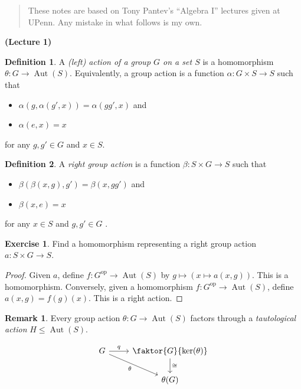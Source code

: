 \documentclass[10pt,letterpaper,cm]{nupset}
\theoremstyle{definition}
\newtheorem*{definition}{Definition}
\newtheorem{remark}{Remark}
\newtheorem{exercise}{Exercise}
\newcommand{\1}{\mathbf{1}}
\newcommand{\0}{\vec 0}
\DeclareMathOperator{\aut}{Aut}
\DeclareMathOperator{\op}{op}
\begin{document}
\begin{abstract}
These notes are based on Tony Pantev's ``Algebra I'' lectures given at UPenn. Any mistake in what follows is my own.
\end{abstract}

\begin{center}
{\textbf{(Lecture 1)}} 
\end{center}

\begin{definition} 
A \textit{(left) action of a group $G$ on a set $S$} is a homomorphism $\theta : G \to \aut(S)$. Equivalently, a group action is a function $\alpha : G \times S \to S$ such that 
\begin{itemize}
\item $\alpha(g, \alpha(g', x)) = \alpha(gg', x)$ and
\item $\alpha(e, x) = x$
\end{itemize}
for any $g,g' \in G$ and $x\in S$. 
\end{definition}

\begin{definition}
A \textit{right group action} is a function $\beta: S \times G \to S$ such that 
\begin{itemize}
\item $\beta(\beta(x, g), g') = \beta(x, gg')$ and
\item $\beta(x, e) = x$
\end{itemize}
for any $x\in S$ and $g,g' \in G$ . 
\end{definition}

\theoremstyle{exercise}
\begin{exercise} Find a homomorphism representing a right group action $a: S \times G \to S$.
\end{exercise}
\begin{proof}
Given $a$, define $f: G^{\op} \to \aut(S)$ by $g \mapsto (x \mapsto a(x, g))$. This is a homomorphism. Conversely, given a homomorphism $f: G^{\op} \to \aut(S)$, define $a(x, g) = f(g)(x)$. This is a right action.
\end{proof}

\theoremstyle{remark}
\begin{remark}{Every group action $\theta: G \to \aut(S)$ factors through a \textit{tautological action} $H \leq \aut(S)$. }

\[ \begin{tikzcd}
G \arrow{r}{q} \arrow[swap]{dr} {\theta} & \faktor{G}{\ker(\theta)} \arrow{d}{\cong} \\%
 & \theta(G)
\end{tikzcd}
\]
\end{remark}
\end{document}
